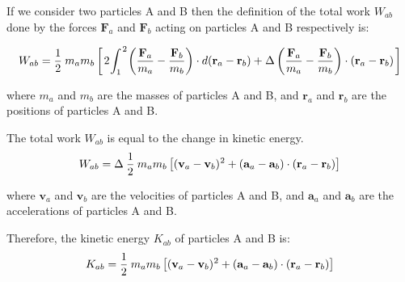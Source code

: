 \documentclass[10pt]{article}
\newcommand{\mM}{m}
\newcommand{\mW}{W}
\newcommand{\mK}{K}
\newcommand{\ra}{_a}
\newcommand{\rb}{_b}
\newcommand{\rab}{_{ab}}
\newcommand{\vR}{\mathbf{r}}
\newcommand{\vV}{\mathbf{v}}
\newcommand{\vA}{\mathbf{a}}
\newcommand{\vF}{\mathbf{F}}
\begin{document}
\par If we consider two particles A and B then the definition of the total work $\mW\rab$ done by the forces $\vF\ra$ and $\vF\rb$ acting on particles A and B respectively is:
\par \vspace{-0.30em}
{\fontsize{8}{8}\selectfont\begin{eqnarray*}
\mW\rab = \frac{1}{2} \hspace{+0.24em} \mM\ra\mM\rb \left[ \hspace{+0.12em} 2 \hspace{-0.12em} \int_1^{\hspace{+0.09em} 2} \hspace{-0.12em} \left(\frac{\vF\ra}{\mM\ra} - \frac{\vF\rb}{\mM\rb}\right) \cdot d(\vR\ra - \vR\rb) + \hspace{+0.03em} \Delta \left(\frac{\vF\ra}{\mM\ra} - \frac{\vF\rb}{\mM\rb}\right) \cdot (\vR\ra - \vR\rb) \hspace{+0.12em} \right]
\end{eqnarray*}}
\vspace{-0.60em}
\par \noindent where $\mM\ra$ and $\mM\rb$ are the masses of particles A and B, and $\vR\ra$ and $\vR\rb$ are the positions of particles A and B.
\medskip
\par The total work $\mW\rab$ is equal to the change in kinetic energy.
\vspace{+0.03em}
{\fontsize{8}{8}\selectfont\begin{eqnarray*}
\mW\rab = \Delta \hspace{+0.24em} \frac{1}{2} \hspace{+0.24em} \mM\ra\mM\rb \left[(\vV\ra - \vV\rb)^{\hspace{+0.03em} 2} + (\vA\ra - \vA\rb) \cdot (\vR\ra - \vR\rb)\right]
\end{eqnarray*}}
\vspace{-0.90em}
\par \noindent where $\vV\ra$ and $\vV\rb$ are the velocities of particles A and B, and $\vA\ra$ and $\vA\rb$ are the accelerations of particles A and B.
\medskip
\par Therefore, the kinetic energy $\mK\rab$ of particles A and B is:
{\fontsize{8}{8}\selectfont\begin{eqnarray*}
\mK\rab = \frac{1}{2} \hspace{+0.24em} \mM\ra\mM\rb \left[(\vV\ra - \vV\rb)^{\hspace{+0.03em} 2} + (\vA\ra - \vA\rb) \cdot (\vR\ra - \vR\rb)\right]
\end{eqnarray*}}
\end{document}
